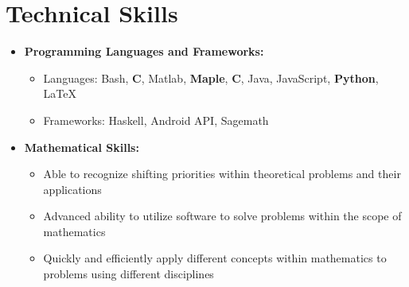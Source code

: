 \documentclass[11pt,letterpaper,sans]{moderncv}
\renewcommand{\_}{\textscale{.7}{\textunderscore}}
\newcommand{\Rplus}{\protect\hspace{-.1em}\protect\raisebox{.35ex}{\smaller{\smaller\textbf{+}}}}
\newcommand{\Cpp}{\mbox{C\Rplus\Rplus}\xspace}
\begin{document}
\section{Technical Skills}
\vspace{1em}
\begin{itemize}
\item \textbf{Programming Languages and Frameworks:}
\begin{itemize}
    \item {Languages:} Bash, \textbf{C}, Matlab, \textbf{Maple}, \textbf{\Cpp}, Java, JavaScript, \textbf{Python}, \LaTeX
    \item {Frameworks:} Haskell, Android API, Sagemath
\end{itemize}
\vspace{0.5em}
\item \textbf{Mathematical Skills:}
\begin{itemize}
    \item Able to recognize shifting priorities within theoretical problems and their applications
    \item Advanced ability to utilize software to solve problems within the scope of mathematics
    \item Quickly and efficiently apply different concepts within mathematics to problems using different disciplines
\end{itemize}
\end{itemize}
\vspace*{-5cm}
\end{document}
